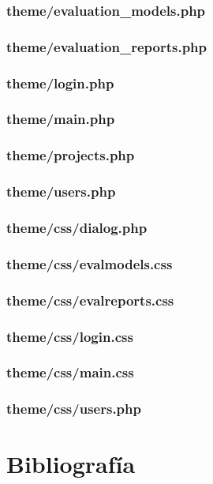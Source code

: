 \documentclass[12pt,a4paper,spanish,twoside]{article}
\begin{document}
\subsubsection{theme/evaluation\_models.php}


\subsubsection{theme/evaluation\_reports.php}


\subsubsection{theme/login.php}


\subsubsection{theme/main.php}


\subsubsection{theme/projects.php}


\subsubsection{theme/users.php}


\subsubsection{theme/css/dialog.php}


\subsubsection{theme/css/evalmodels.css}


\subsubsection{theme/css/evalreports.css}


\subsubsection{theme/css/login.css}


\subsubsection{theme/css/main.css}


\subsubsection{theme/css/users.php}


\section{Bibliografía}
\end{document}

